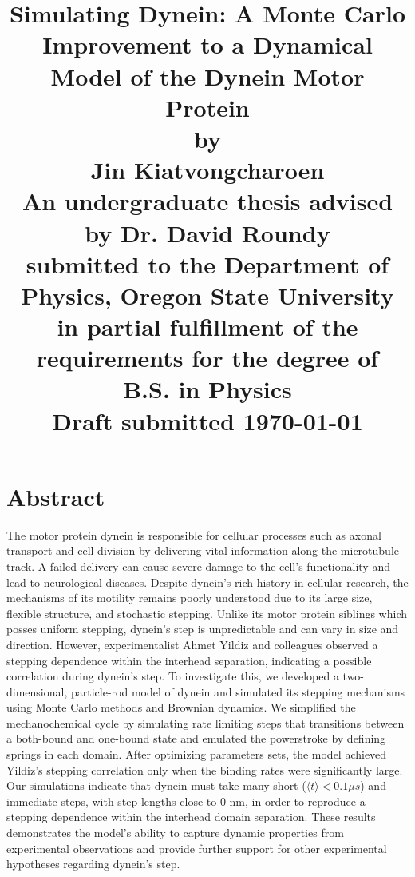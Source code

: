 \documentclass[12pt]{report}
\title{
	\Large{Simulating Dynein: A Monte Carlo Improvement to a Dynamical Model of the Dynein Motor Protein}\vspace{1em}\\
	\large{by} \\ 
	\Large{Jin Kiatvongcharoen} \vspace{0.5em}\\[2in] 
	\normalsize{An undergraduate thesis advised by Dr. David Roundy}\\
	\normalsize{submitted to the Department of Physics, Oregon State University}\\%
	\normalsize{in partial fulfillment of the requirements for the degree of}\\
	\normalsize{B.S. in Physics}\vspace{1.5 em}\\
	\normalsize{Draft submitted \today}\\


}
\date{}
\begin{document}
    \maketitle
    \onehalfspacing


	\chapter*{Abstract}
	The motor protein dynein is responsible for cellular processes such as axonal transport and cell division by delivering vital information along the microtubule track. A failed delivery can cause severe damage to the cell’s functionality and lead to neurological diseases. Despite dynein's rich history in cellular research, the mechanisms of its motility remains poorly understood due to its large size, flexible structure, and stochastic stepping. Unlike its motor protein siblings which posses uniform stepping, dynein's step is unpredictable and can vary in size and direction. However, experimentalist Ahmet Yildiz and colleagues observed a stepping dependence within the interhead separation, indicating a possible correlation during dynein's step. To investigate this, we developed a two-dimensional, particle-rod model of dynein and simulated its stepping mechanisms using Monte Carlo methods and Brownian dynamics. We simplified the mechanochemical cycle by simulating rate limiting steps that transitions between a both-bound and one-bound state and emulated the powerstroke by defining springs in each domain. After optimizing parameters sets, the model achieved Yildiz's stepping correlation only when the binding rates were significantly large. Our simulations indicate that dynein must take many short ($\langle t \rangle < 0.1 \mu s$) and immediate steps, with step lengths close to 0 nm, in order to reproduce a stepping dependence within the interhead domain separation. These results demonstrates the model's ability to capture dynamic properties from experimental observations and provide further support for other experimental hypotheses regarding dynein's step.
	
	 
%	
%	
	
\end{document}
